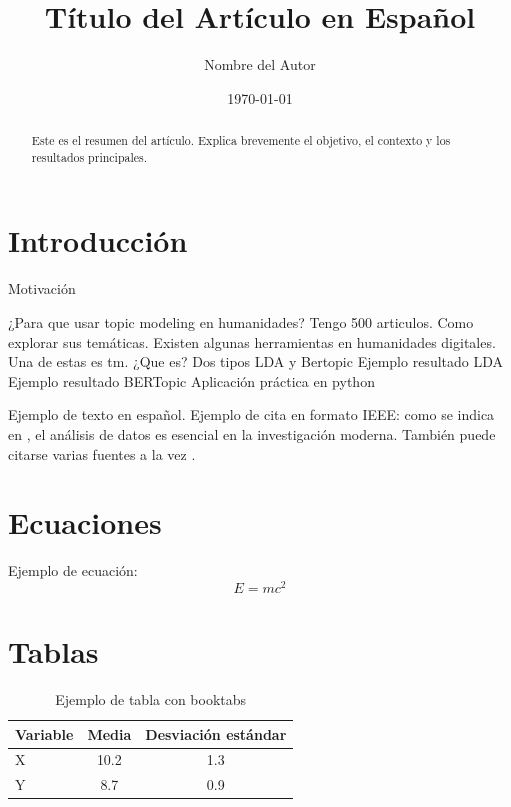 \documentclass[12pt,a4paper]{article}
\title{Título del Artículo en Español}
\author{Nombre del Autor}
\date{\today}
\begin{document}
	
	\maketitle
	
	\begin{abstract}
		Este es el resumen del artículo. Explica brevemente el objetivo, el contexto y los resultados principales.
	\end{abstract}
	
	\section{Introducción}
	
	Motivación
	
	¿Para que usar topic modeling en humanidades?
	Tengo 500 articulos. Como explorar sus temáticas. 
	Existen algunas herramientas en humanidades digitales. Una de estas es tm.
	¿Que es?
	Dos tipos
	LDA y Bertopic
	Ejemplo resultado LDA
	Ejemplo resultado BERTopic
	Aplicación práctica en python
	
	
	
	
	Ejemplo de texto en español.  
	Ejemplo de cita en formato IEEE: como se indica en \cite{autor2020}, el análisis de datos es esencial en la investigación moderna.  
	También puede citarse varias fuentes a la vez \cite{gomez2019,lopez2021}.
	
	\section{Ecuaciones}
	
	Ejemplo de ecuación:
	\begin{equation}
		E = mc^2
	\end{equation}
	
	\section{Tablas}
	
	\begin{table}[H]
		\centering
		\caption{Ejemplo de tabla con booktabs}
		\begin{tabular}{lcc}
			\toprule
			Variable & Media & Desviación estándar \\
			\midrule
			X & 10.2 & 1.3 \\
			Y & 8.7 & 0.9 \\
			\bottomrule
		\end{tabular}
	\end{table}
	
\end{document}
